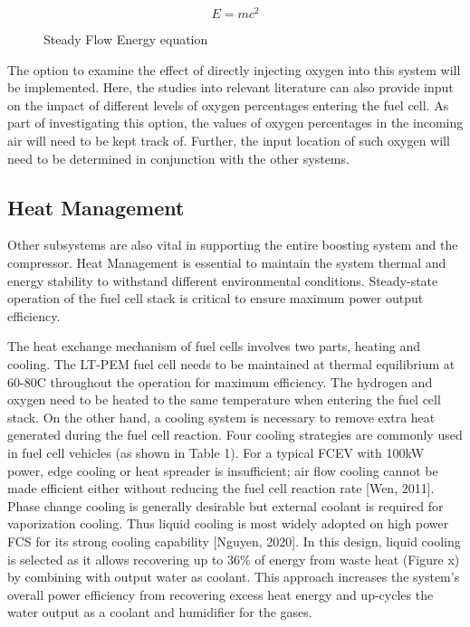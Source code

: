 \documentclass[a4paper,11pt]{article}
\begin{document}
\begin{figure}[h]
\begin{equation} 
    E=mc^2
\end{equation}
\caption{Steady Flow Energy equation}
\end{figure}\label{eq:rateOfHeatAdded}

The option to examine the effect of directly injecting oxygen into this system will be implemented. Here, the studies into relevant literature can also provide input on the impact of different levels of oxygen percentages entering the fuel cell. As part of investigating this option, the values of oxygen percentages in the incoming air will need to be kept track of. Further, the input location of such oxygen will need to be determined in conjunction with the other systems.  

\subsection{Heat Management}
Other subsystems are also vital in supporting the entire boosting system and the compressor. Heat Management is essential to maintain the system thermal and energy stability to withstand different environmental conditions. Steady-state operation of the fuel cell stack is critical to ensure maximum power output efficiency.  

The heat exchange mechanism of fuel cells involves two parts, heating and cooling. The LT-PEM fuel cell needs to be maintained at thermal equilibrium at 60-80\degree C throughout the operation for maximum efficiency. The hydrogen and oxygen need to be heated to the same temperature when entering the fuel cell stack. On the other hand, a cooling system is necessary to remove extra heat generated during the fuel cell reaction. Four cooling strategies are commonly used in fuel cell vehicles (as shown in Table 1). For a typical FCEV with 100kW power, edge cooling or heat spreader is insufficient; air flow cooling cannot be made efficient either without reducing the fuel cell reaction rate [Wen, 2011]. Phase change cooling is generally desirable but external coolant is required for vaporization cooling. Thus liquid cooling is most widely adopted on high power FCS for its strong cooling capability [Nguyen, 2020].  In this design, liquid cooling is selected as it allows recovering up to 36\% of energy from waste heat (Figure x) by combining with output water as coolant. This approach increases the system's overall power efficiency from recovering excess heat energy and up-cycles the water output as a coolant and humidifier for the gases. 
\end{document}
